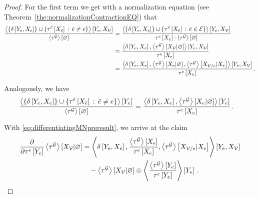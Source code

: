 \begin{proof}
    For the first term we get with a normalization equation (see Theorem~\ref{the:normalizationContractionEQ}) that
    \begin{align*}
        \frac{ \left\langle \{\delta\left[Y_{e},X_{e}\right]\}\cup\{\tau^{\tilde{e}}\left[X_{\tilde{e}}\right] \, : \, \tilde{e}\neq e \}\right\rangle \left[ Y_{e},X_{\mathcal{V}} \right]}{\left\langle \tau^{\mathcal{G}}\right\rangle \left[ \varnothing \right]}
        &= \frac{\left\langle \{\delta\left[Y_{e},X_{e}\right]\}\cup\{\tau^{\tilde{e}}\left[X_{\tilde{e}}\right] \, : \, \tilde{e}\in\mathcal{E} \}\right\rangle \left[ Y_{e},X_{\mathcal{V}} \right]}{\tau^{e}\left[X_{e}\right]  \cdot \left\langle \tau^{\mathcal{G}}\right\rangle \left[ \varnothing \right]} \\
        &= \frac{
            \left\langle \delta\left[Y_{e},X_{e}\right],\left\langle \tau^{\mathcal{G}}\right\rangle \left[ X_{\mathcal{V}} | \varnothing \right]\right\rangle \left[ Y_{e},X_{\mathcal{V}} \right]
        }{\tau^{e}\left[X_{e}\right]}  \\
        &= \frac{\left\langle \delta\left[Y_{e},X_{e}\right],
            \left\langle \tau^{\mathcal{G}}\right\rangle \left[ X_{e} | \varnothing \right],
            \left\langle \tau^{\mathcal{G}}\right\rangle \left[ X_{\mathcal{V}/e} | X_{e} \right]
        \right\rangle \left[ Y_{e},X_{\mathcal{V}} \right]
        }{\tau^{e}\left[X_{e}\right]}  \, .
    \end{align*}

    Analogously, we have
    \begin{align*}
        \frac{ \contractionof{\{\identityat{\seccatvariableof{\edge},\edgevariables}\}\cup\{\hypercoreofat{\secedge}{\catvariableof{\secedge}} \, : \, \secedge\neq\edge \}}{\seccatvariableof{\edge}}}{\contraction{\extnet}}
        &= \frac{\contractionof{\identityat{\seccatvariableof{\edge},\edgevariables},
            \normalizationof{\extnet}{\edgevariables}%
        }{\seccatvariableof{\edge}}
        }{\hypercoreofat{\edge}{\edgevariables}}  \, .
    \end{align*}

    With \eqref{eq:differentiatingMNpreresult}, we arrive at the claim
    \begin{align*}
        \frac{\partial }{\partial \tau^{e}\left[Y_{e}\right]} \left\langle \tau^{\mathcal{G}}\right\rangle \left[ X_{\mathcal{V}} | \varnothing \right]
        & = \left\langle 
            \delta\left[Y_{e},X_{e}\right],
            \frac{\left\langle \tau^{\mathcal{G}}\right\rangle \left[ X_{e} \right]}{\tau^{e}\left[X_{e}\right]},
            \left\langle \tau^{\mathcal{G}}\right\rangle \left[ X_{\mathcal{V}/e} | X_{e} \right] \right\rangle \left[ Y_{e},X_{\mathcal{V}} \right] \\
        & \quad -  \left\langle \tau^{\mathcal{G}}\right\rangle \left[ X_{\mathcal{V}} | \varnothing \right] \otimes \left\langle \frac{\left\langle \tau^{\mathcal{G}}\right\rangle \left[ Y_{e} \right]}{\tau^{e}\left[Y_{e}\right]}
        \right\rangle \left[ Y_{e} \right] \, .
    \end{align*}

\end{proof}



